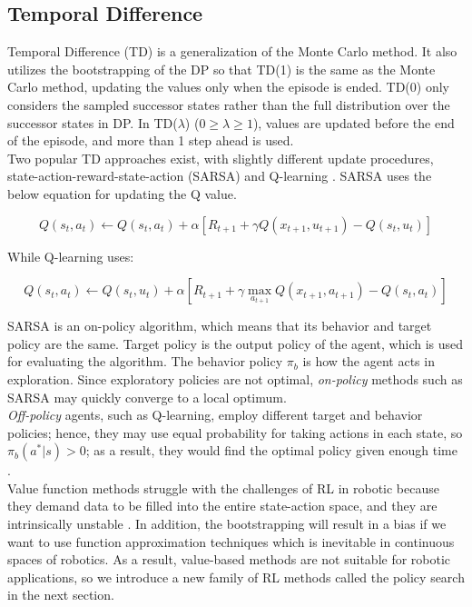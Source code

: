 \subsection{Temporal Difference}

Temporal Difference (TD) is a generalization of the Monte Carlo method. It also utilizes the bootstrapping of the DP so that TD(1) is the same as the Monte Carlo method, updating the values only when the episode is ended. TD(0) only considers the sampled successor states rather than the full distribution over the successor states in DP. In TD($\lambda$) ($0\geq\lambda\geq1$), values are updated before the end of the episode, and more than 1 step ahead is used.\\

Two popular TD approaches exist, with slightly different update procedures, state-action-reward-state-action (SARSA) \cite{rummery1994line}  and Q-learning \cite{watkins1992q}. SARSA uses the below equation for updating the Q value.

\begin{equation*}
	Q(s_t,a_t) \leftarrow Q(s_t,a_t) + \alpha [R_{t+1} + \gamma Q(x_{t+1},u_{t+1})-Q(s_t,u_t)]
\end{equation*}

While Q-learning uses:

\begin{equation}
	Q(s_t,a_t) \leftarrow Q(s_t,u_t) + \alpha [R_{t+1} + \gamma \max_{a_{t+1}} Q(x_{t+1},a_{t+1}) - Q(s_t,a_t)]
\end{equation}

SARSA is an on-policy algorithm, which means that its behavior and target policy are the same. Target policy is the output policy of the agent, which is used for evaluating the algorithm. The behavior policy $\pi_b$ is how the agent acts in exploration. Since exploratory policies are not optimal, \textit{on-policy} methods such as SARSA may quickly converge to a local optimum.\\

\textit{Off-policy} agents, such as Q-learning, employ different target and behavior policies; hence, they may use equal probability for taking actions in each state, so $\pi_b(a^*|s)>0$; as a result, they would find the optimal policy given enough time \cite{sutton1988learning}.\\

Value function methods struggle with the challenges of RL in robotic because they demand data to be filled into the entire state-action space, and they are intrinsically unstable \cite{szepesvari2010algorithms}. In addition, the bootstrapping will result in a bias if we want to use function approximation techniques which is inevitable in continuous spaces of robotics. As a result, value-based methods are not suitable for robotic applications, so we introduce a new family of RL methods called the policy search in the next section.

